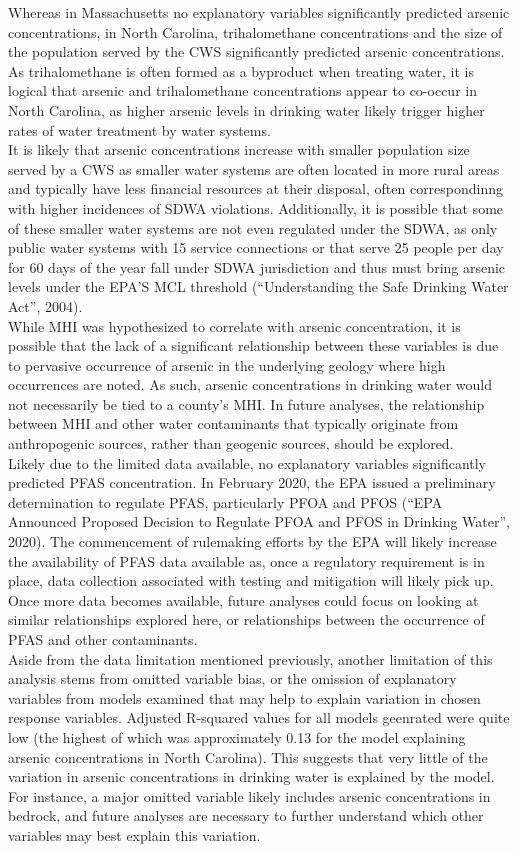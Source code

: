 \documentclass[12pt,]{article}
\begin{document}
Whereas in Massachusetts no explanatory variables significantly
predicted arsenic concentrations, in North Carolina, trihalomethane
concentrations and the size of the population served by the CWS
significantly predicted arsenic concentrations. As trihalomethane is
often formed as a byproduct when treating water, it is logical that
arsenic and trihalomethane concentrations appear to co-occur in North
Carolina, as higher arsenic levels in drinking water likely trigger
higher rates of water treatment by water systems.\\
It is likely that arsenic concentrations increase with smaller
population size served by a CWS as smaller water systems are often
located in more rural areas and typically have less financial resources
at their disposal, often correspondinng with higher incidences of SDWA
violations. Additionally, it is possible that some of these smaller
water systems are not even regulated under the SDWA, as only public
water systems with 15 service connections or that serve 25 people per
day for 60 days of the year fall under SDWA jurisdiction and thus must
bring arsenic levels under the EPA'S MCL threshold (``Understanding the
Safe Drinking Water Act'', 2004).\\
While MHI was hypothesized to correlate with arsenic concentration, it
is possible that the lack of a significant relationship between these
variables is due to pervasive occurrence of arsenic in the underlying
geology where high occurrences are noted. As such, arsenic
concentrations in drinking water would not necessarily be tied to a
county's MHI. In future analyses, the relationship between MHI and other
water contaminants that typically originate from anthropogenic sources,
rather than geogenic sources, should be explored.\\
Likely due to the limited data available, no explanatory variables
significantly predicted PFAS concentration. In February 2020, the EPA
issued a preliminary determination to regulate PFAS, particularly PFOA
and PFOS (``EPA Announced Proposed Decision to Regulate PFOA and PFOS in
Drinking Water'', 2020). The commencement of rulemaking efforts by the
EPA will likely increase the availability of PFAS data available as,
once a regulatory requirement is in place, data collection associated
with testing and mitigation will likely pick up. Once more data becomes
available, future analyses could focus on looking at similar
relationships explored here, or relationships between the occurrence of
PFAS and other contaminants.\\
Aside from the data limitation mentioned previously, another limitation
of this analysis stems from omitted variable bias, or the omission of
explanatory variables from models examined that may help to explain
variation in chosen response variables. Adjusted R-squared values for
all models geenrated were quite low (the highest of which was
approximately 0.13 for the model explaining arsenic concentrations in
North Carolina). This suggests that very little of the variation in
arsenic concentrations in drinking water is explained by the model. For
instance, a major omitted variable likely includes arsenic
concentrations in bedrock, and future analyses are necessary to further
understand which other variables may best explain this variation.
\end{document}
